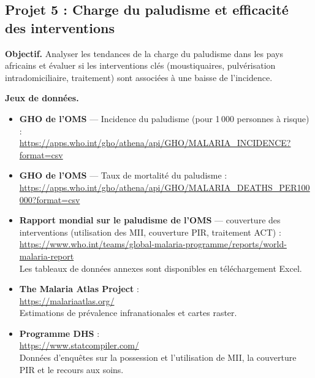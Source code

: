 \subsection{Projet 5 : Charge du paludisme et efficacit\'e des interventions}

\textbf{Objectif.} Analyser les tendances de la charge du paludisme dans les pays africains et \'evaluer si les interventions cl\'es (moustiquaires, pulv\'erisation intradomiciliaire, traitement) sont associ\'ees \`a une baisse de l'incidence.

\textbf{Jeux de donn\'ees.}
\begin{itemize}
  \item \textbf{GHO de l'OMS} --- Incidence du paludisme (pour 1\,000 personnes \`a risque) :\\
  \url{https://apps.who.int/gho/athena/api/GHO/MALARIA_INCIDENCE?format=csv}
  \item \textbf{GHO de l'OMS} --- Taux de mortalit\'e du paludisme :\\
  \url{https://apps.who.int/gho/athena/api/GHO/MALARIA_DEATHS_PER100000?format=csv}
  \item \textbf{Rapport mondial sur le paludisme de l'OMS} --- couverture des interventions (utilisation des MII, couverture PIR, traitement ACT) :\\
  \url{https://www.who.int/teams/global-malaria-programme/reports/world-malaria-report}\\
  Les tableaux de donn\'ees annexes sont disponibles en t\'el\'echargement Excel.
  \item \textbf{The Malaria Atlas Project} :\\
  \url{https://malariaatlas.org/}\\
  Estimations de pr\'evalence infranationales et cartes raster.
  \item \textbf{Programme DHS} :\\
  \url{https://www.statcompiler.com/}\\
  Donn\'ees d'enqu\^etes sur la possession et l'utilisation de MII, la couverture PIR et le recours aux soins.
\end{itemize}

